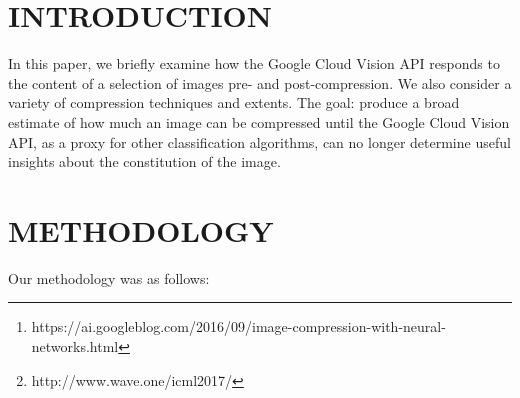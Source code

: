 \begin{abstract}

As the use of artificial intelligence continues to expand into the realm of image compression\footnote{https://ai.googleblog.com/2016/09/image-compression-with-neural-networks.html}\footnote{http://www.wave.one/icml2017/} questions are raised on how well the original artefacts and nature of the source image are preserved. The consequence of being able to utilize smaller output images, that maintain the majority of pertinent information, from their often 10 times larger source is huge. With smaller inputs applications from self driving cars that rely on camera input, autonomous flight, through to training neural nets could require significantly less processing time and resources.
In this paper, we briefly examine how the Google Cloud Vision API responds to the content of a selection of images pre- and post-compression. We also consider a variety of compression techniques and extents. The goal: produce a broad estimate of how much an image can be compressed until the Google Cloud Vision API, as a proxy for other classification algorithms, can no longer determine useful insights about the constitution of the image.

An interactive exploration of the results is available at the following URI: https://mit18065-dimensions.herokuapp.com/

\end{abstract}

\section{INTRODUCTION}

In this paper, we briefly examine how the Google Cloud Vision API responds to the content of a selection of images pre- and post-compression. We also consider a variety of compression techniques and extents. The goal: produce a broad estimate of how much an image can be compressed until the Google Cloud Vision API, as a proxy for other classification algorithms, can no longer determine useful insights about the constitution of the image.

\section{METHODOLOGY}
Our methodology was as follows:

